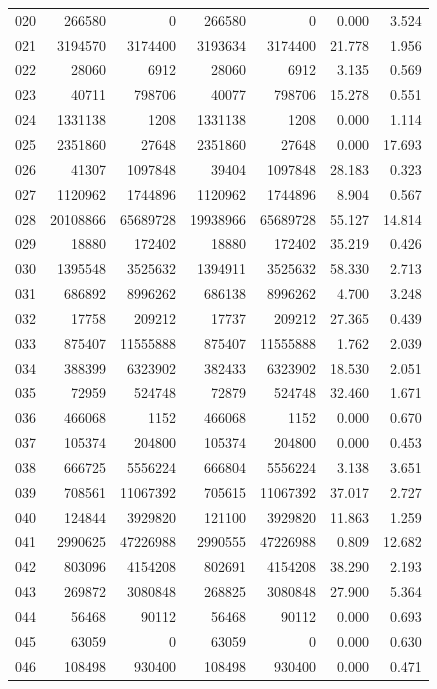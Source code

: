 \begin{longtable}{lrrrrrr}
020 & 266580 & 0 & 266580 & 0 & 0.000 & 3.524\\
021 & 3194570 & 3174400 & 3193634 & 3174400 & 21.778 & 1.956\\
022 & 28060 & 6912 & 28060 & 6912 & 3.135 & 0.569\\
023 & 40711 & 798706 & 40077 & 798706 & 15.278 & 0.551\\
024 & 1331138 & 1208 & 1331138 & 1208 & 0.000 & 1.114\\
025 & 2351860 & 27648 & 2351860 & 27648 & 0.000 & 17.693\\
026 & 41307 & 1097848 & 39404 & 1097848 & 28.183 & 0.323\\
027 & 1120962 & 1744896 & 1120962 & 1744896 & 8.904 & 0.567\\
028 & 20108866 & 65689728 & 19938966 & 65689728 & 55.127 & 14.814\\
029 & 18880 & 172402 & 18880 & 172402 & 35.219 & 0.426\\
030 & 1395548 & 3525632 & 1394911 & 3525632 & 58.330 & 2.713\\
031 & 686892 & 8996262 & 686138 & 8996262 & 4.700 & 3.248\\
032 & 17758 & 209212 & 17737 & 209212 & 27.365 & 0.439\\
033 & 875407 & 11555888 & 875407 & 11555888 & 1.762 & 2.039\\
034 & 388399 & 6323902 & 382433 & 6323902 & 18.530 & 2.051\\
035 & 72959 & 524748 & 72879 & 524748 & 32.460 & 1.671\\
036 & 466068 & 1152 & 466068 & 1152 & 0.000 & 0.670\\
037 & 105374 & 204800 & 105374 & 204800 & 0.000 & 0.453\\
038 & 666725 & 5556224 & 666804 & 5556224 & 3.138 & 3.651\\
039 & 708561 & 11067392 & 705615 & 11067392 & 37.017 & 2.727\\
040 & 124844 & 3929820 & 121100 & 3929820 & 11.863 & 1.259\\
041 & 2990625 & 47226988 & 2990555 & 47226988 & 0.809 & 12.682\\
042 & 803096 & 4154208 & 802691 & 4154208 & 38.290 & 2.193\\
043 & 269872 & 3080848 & 268825 & 3080848 & 27.900 & 5.364\\
044 & 56468 & 90112 & 56468 & 90112 & 0.000 & 0.693\\
045 & 63059 & 0 & 63059 & 0 & 0.000 & 0.630\\
046 & 108498 & 930400 & 108498 & 930400 & 0.000 & 0.471\\

\end{longtable}
